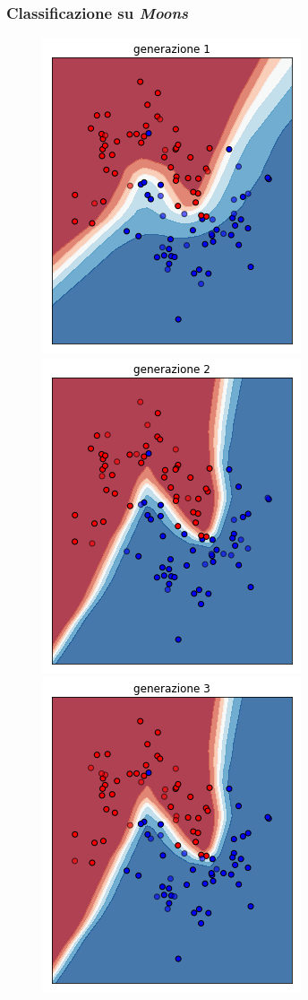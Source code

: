 \documentclass{beamer}
\begin{document}
\begin{frame}
 \frametitle{Classificazione su \textit{Moons}}
 \begin{figure}[H]
 \centering
 \includegraphics[scale = 0.25]{images/moons-rnd-log./1.png}
 \includegraphics[scale = 0.25]{images/moons-rnd-log./2.png}
 \includegraphics[scale = 0.25]{images/moons-rnd-log./3.png}

\end{figure}
\end{frame}
\end{document}
